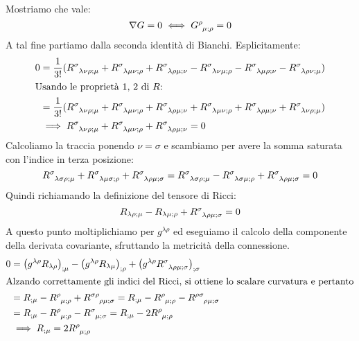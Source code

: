 Mostriamo che vale:
\begin{equation*}
    \nabla G = 0 \iff \tensor{G}{^\rho_{\mu;\rho}} = 0
\end{equation*}
A tal fine partiamo dalla seconda identità di Bianchi. Esplicitamente:
\begin{align*}
    0&=   \frac{1}{3!}(\tensor{R}{^\sigma_{\lambda\nu\rho;\mu}} + \tensor{R}{^\sigma_{\lambda\mu\nu;\rho}} + \tensor{R}{^\sigma_{\lambda\rho\mu;\nu}} - \tensor{R}{^\sigma_{\lambda\nu\mu;\rho}} - \tensor{R}{^\sigma_{\lambda\mu\rho;\nu}} - \tensor{R}{^\sigma_{\lambda\rho\nu;\mu}}) \\
\intertext{Usando le proprietà 1, 2 di $R$:}
    &= \frac{1}{3!}(
    \tensor{R}{^\sigma_{\lambda\nu\rho;\mu}} + \tensor{R}{^\sigma_{\lambda\mu\nu;\rho}} + \tensor{R}{^\sigma_{\lambda\rho\mu;\nu}} + \tensor{R}{^\sigma_{\lambda\mu\nu;\rho}} + \tensor{R}{^\sigma_{\lambda\rho\mu;\nu}} + \tensor{R}{^\sigma_{\lambda\nu\rho;\mu}}) \\
    &\implies 
    \tensor{R}{^\sigma_{\lambda\nu\rho;\mu}} +
    \tensor{R}{^\sigma_{\lambda\mu\nu;\rho}} +
    \tensor{R}{^\sigma_{\lambda\rho\mu;\nu}} = 0
\end{align*}
Calcoliamo la traccia ponendo $\nu=\sigma$ e scambiamo per avere la somma saturata con l'indice in terza posizione:
\begin{equation*}
    \tensor{R}{^\sigma_{\lambda\sigma\rho;\mu}} +
    \tensor{R}{^\sigma_{\lambda\mu\sigma;\rho}} +
    \tensor{R}{^\sigma_{\lambda\rho\mu;\sigma}} = 
    \tensor{R}{^\sigma_{\lambda\sigma\rho;\mu}} -
    \tensor{R}{^\sigma_{\lambda\sigma\mu;\rho}} +
    \tensor{R}{^\sigma_{\lambda\rho\mu;\sigma}} = 0
\end{equation*}
Quindi richiamando la definizione del tensore di Ricci:
\begin{equation*}
    R_{\lambda\rho;\mu}  - R_{\lambda\mu;\rho} +     \tensor{R}{^\sigma_{\lambda\rho\mu;\sigma}} = 0
\end{equation*}
A questo punto moltiplichiamo per $g^{\lambda\rho}$ ed eseguiamo il calcolo della componente della derivata covariante, sfruttando la metricità della connessione.
\begin{align*}
   0 &= \left( g^{\lambda\rho} R_{\lambda\rho} \right)_{;\mu} -
    \left( g^{\lambda\rho} R_{\lambda\mu} \right)_{;\rho} +
    \left( g^{\lambda\rho} \tensor{R}{^\sigma_{\lambda\rho\mu;\sigma}} \right)_{;\sigma} \\
\intertext{Alzando correttamente gli indici del Ricci, si ottiene lo scalare curvatura e pertanto}
    &= R_{;\mu} - \tensor{R}{^\rho_{\mu;\rho}} + \tensor{R}{^{\sigma\rho}_{\rho\mu;\sigma}} = 
    R_{;\mu} - \tensor{R}{^\rho_{\mu;\rho}} - \tensor{R}{^{\rho\sigma}_{\rho\mu;\sigma}} \\
    &= R_{;\mu}  - \tensor{R}{^\rho_{\mu;\rho}} - \tensor{R}{^\sigma_{\mu;\sigma}} = R_{;\mu}  - 2 \tensor{R}{^\rho_{\mu;\rho}} \\
    &\implies R_{;\mu} = 2 \tensor{R}{^\rho_{\mu;\rho}}
\end{align*}
